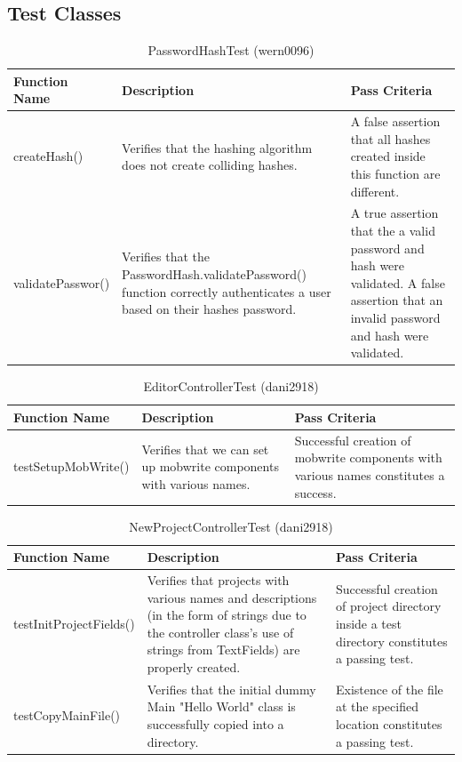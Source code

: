 \documentclass[14pt, a4paper]{article}
\begin{document}
\subsection{Test Classes}

\begin{table}[h]
	\centering	
	\caption{PasswordHashTest (wern0096)}
	\begin{tabular}{|p{3cm}|p{6cm}|p{6cm}|} 
		\hline
		\textbf{Function Name} & \textbf{Description} & \textbf{Pass Criteria}  \\\hline
		createHash() & Verifies that the hashing algorithm does not create colliding hashes. & A false assertion that all hashes created inside this function are different. \\\hline
		validatePasswor() & Verifies that the PasswordHash.validatePassword() function correctly authenticates a user based on their hashes password. & A true assertion that the a valid password and hash were validated. A false assertion that an invalid password and hash were validated.  \\\hline
	\end{tabular}
\end{table}


\begin{table}[h]
	\centering
	\caption{EditorControllerTest (dani2918)}
	\begin{tabular}{|p{3cm}|p{6cm}|p{6cm}|}
		\hline
		\textbf{Function Name} & \textbf{Description} & \textbf{Pass Criteria}  \\\hline
		testSetupMobWrite() & Verifies that we can set up mobwrite components with various names. & Successful creation of mobwrite components with various names constitutes a success.
		  \\\hline
	\end{tabular}
\end{table}

\begin{table}[h]
	\centering
	\caption{NewProjectControllerTest (dani2918)}
	\begin{tabular}{|p{3cm}|p{6cm}|p{6cm}|}
		\hline
		\textbf{Function Name} & \textbf{Description} & \textbf{Pass Criteria}  \\\hline
		testInitProjectFields() & Verifies that projects with various names and descriptions (in the form of strings due to the controller class's use of strings from TextFields) are properly created. & Successful creation of project directory inside a test directory constitutes a passing test.
		  \\\hline
		  testCopyMainFile() & Verifies that the initial dummy Main "Hello World" class is successfully copied into a directory. & Existence of the file at the specified location constitutes a passing test.
		  \\\hline
	\end{tabular}
\end{table}
\end{document}
